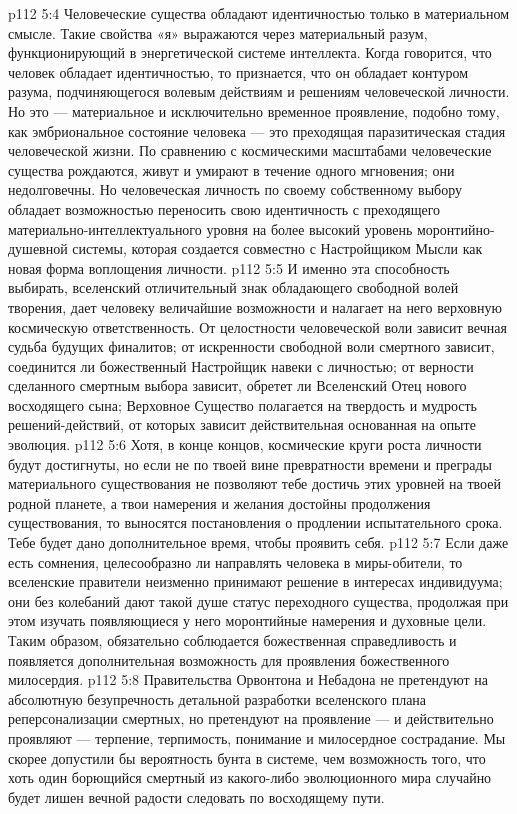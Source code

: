 \vs p112 5:4 Человеческие существа обладают идентичностью только в материальном смысле. Такие свойства «я» выражаются через материальный разум, функционирующий в энергетической системе интеллекта. Когда говорится, что человек обладает идентичностью, то признается, что он обладает контуром разума, подчиняющегося волевым действиям и решениям человеческой личности. Но это --- материальное и исключительно временное проявление, подобно тому, как эмбриональное состояние человека --- это преходящая паразитическая стадия человеческой жизни. По сравнению с космическими масштабами человеческие существа рождаются, живут и умирают в течение одного мгновения; они недолговечны. Но человеческая личность по своему собственному выбору обладает возможностью переносить свою идентичность с преходящего материально\hyp{}интеллектуального уровня на более высокий уровень моронтийно\hyp{}душевной системы, которая создается совместно с Настройщиком Мысли как новая форма воплощения личности.
\vs p112 5:5 И именно эта способность выбирать, вселенский отличительный знак обладающего свободной волей творения, дает человеку величайшие возможности и налагает на него верховную космическую ответственность. От целостности человеческой воли зависит вечная судьба будущих финалитов; от искренности свободной воли смертного зависит, соединится ли божественный Настройщик навеки с личностью; от верности сделанного смертным выбора зависит, обретет ли Вселенский Отец нового восходящего сына; Верховное Существо полагается на твердость и мудрость решений\hyp{}действий, от которых зависит действительная основанная на опыте эволюция.
\vs p112 5:6 \pc Хотя, в конце концов, космические круги роста личности будут достигнуты, но если не по твоей вине превратности времени и преграды материального существования не позволяют тебе достичь этих уровней на твоей родной планете, а твои намерения и желания достойны продолжения существования, то выносятся постановления о продлении испытательного срока. Тебе будет дано дополнительное время, чтобы проявить себя.
\vs p112 5:7 Если даже есть сомнения, целесообразно ли направлять человека в миры\hyp{}обители, то вселенские правители неизменно принимают решение в интересах индивидуума; они без колебаний дают такой душе статус переходного существа, продолжая при этом изучать появляющиеся у него моронтийные намерения и духовные цели. Таким образом, обязательно соблюдается божественная справедливость и появляется дополнительная возможность для проявления божественного милосердия.
\vs p112 5:8 Правительства Орвонтона и Небадона не претендуют на абсолютную безупречность детальной разработки вселенского плана реперсонализации смертных, но претендуют на проявление --- и действительно проявляют --- терпение, терпимость, понимание и милосердное сострадание. Мы скорее допустили бы вероятность бунта в системе, чем возможность того, что хоть один борющийся смертный из какого\hyp{}либо эволюционного мира случайно будет лишен вечной радости следовать по восходящему пути.

